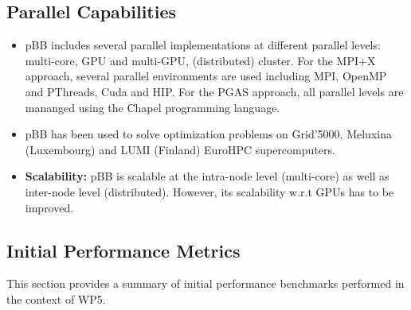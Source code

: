 \subsection{Parallel Capabilities}
\label{sec:WP5:pBB:performances}

\begin{itemize}
    \item pBB includes several parallel implementations at different parallel levels: multi-core, GPU and multi-GPU, (distributed) cluster. For the MPI+X approach, several parallel environments are used including MPI, OpenMP and PThreads, Cuda and HIP. For the PGAS approach, all parallel levels are mananged using the Chapel programming language.
    \item pBB has been used to solve optimization problems on Grid'5000, Meluxina (Luxembourg) and LUMI (Finland) EuroHPC supercomputers.
    \item \textbf{Scalability:} pBB is scalable at the intra-node level (multi-core) as well as inter-node level (distributed). However, its scalability w.r.t GPUs has to be improved.
\end{itemize}

\subsection{Initial Performance Metrics}
\label{sec:WP5:pBB:metrics}

This section provides a summary of initial performance benchmarks performed in the context of WP5. %

